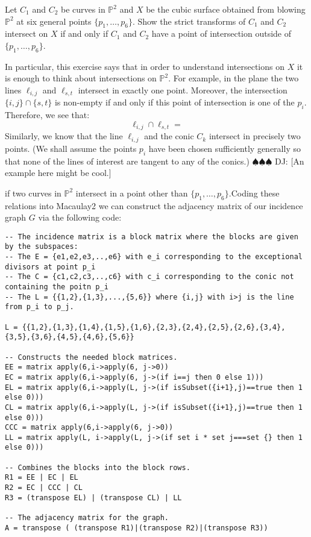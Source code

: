 \documentclass[11pt]{amsart}
\theoremstyle{remark}
\renewcommand{\P}{\mathbb{P}}
\newcommand{\deej}[1]{{\color{red} \sf $\spadesuit\spadesuit\spadesuit$ DJ: [#1]}}
\begin{document}
\begin{ex}
Let $C_1$ and $C_2$ be curves in $\P^2$ and $X$ be the cubic surface obtained from blowing $\P^2$ at six general points $\{p_1,\ldots,p_6\}$. Show the strict transforms of $C_1$ and $C_2$ intersect on $X$ if and only if $C_1$ and $C_2$ have a point of intersection outside of $\{p_1,\ldots,p_6\}$.
\end{ex}

In particular, this exercise says that in order to understand intersections on $X$ it is enough to think about intersections on $\P^2$. For example, in the plane the two lines $\ell_{i,j}$ and $\ell_{s,t}$ intersect in exactly one point. Moreover, the intersection $\{i,j\}\cap \{s,t\}$ is non-empty if and only if this point of intersection is one of the $p_i$. Therefore, we see that:
\[
\ell_{i,j}\cap \ell_{s,t}=
\]
Similarly, we know that the line $\ell_{i,j}$ and the conic $C_{k}$ intersect in precisely two points. (We shall assume the points $p_i$ have been chosen sufficiently generally so that none of the lines of interest are tangent to any of the conics.) \deej{An example here might be cool.}

 if two curves in $\P^2$ intersect in a point other than $\{p_1,\ldots,p_6\}$.Coding these relations into Macaulay2 we can construct the adjacency matrix of our incidence graph $G$ via the following code:
\begin{verbatim}
-- The incidence matrix is a block matrix where the blocks are given by the subspaces:
-- The E = {e1,e2,e3,..,e6} with e_i corresponding to the exceptional divisors at point p_i
-- The C = {c1,c2,c3,..,c6} with c_i corresponding to the conic not containing the poitn p_i
-- The L = {{1,2},{1,3},...,{5,6}} where {i,j} with i>j is the line from p_i to p_j.
 
L = {{1,2},{1,3},{1,4},{1,5},{1,6},{2,3},{2,4},{2,5},{2,6},{3,4},{3,5},{3,6},{4,5},{4,6},{5,6}}

-- Constructs the needed block matrices.
EE = matrix apply(6,i->apply(6, j->0))
EC = matrix apply(6,i->apply(6, j->(if i==j then 0 else 1)))
EL = matrix apply(6,i->apply(L, j->(if isSubset({i+1},j)==true then 1 else 0)))
CL = matrix apply(6,i->apply(L, j->(if isSubset({i+1},j)==true then 1 else 0)))
CCC = matrix apply(6,i->apply(6, j->0))
LL = matrix apply(L, i->apply(L, j->(if set i * set j===set {} then 1 else 0)))

-- Combines the blocks into the block rows.	    
R1 = EE | EC | EL
R2 = EC | CCC | CL
R3 = (transpose EL) | (transpose CL) | LL

-- The adjacency matrix for the graph.
A = transpose ( (transpose R1)|(transpose R2)|(transpose R3))
\end{verbatim}
\end{document}
